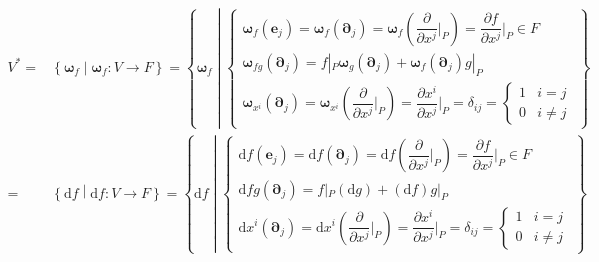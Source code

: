 \documentclass[
]{book}
\theoremstyle{definition}
\theoremstyle{definition}
\theoremstyle{definition}
\theoremstyle{definition}
\theoremstyle{remark}
\begin{document}
\[
\begin{aligned}
V^{*}= & \left\{ \boldsymbol{\omega}_{{\scriptscriptstyle f}}\middle|\boldsymbol{\omega}_{{\scriptscriptstyle f}}:V\rightarrow F\right\} =\left\{ \boldsymbol{\omega}_{{\scriptscriptstyle f}}\middle|\begin{cases}
\boldsymbol{\omega}_{{\scriptscriptstyle f}}\left(\boldsymbol{e}_{{\scriptscriptstyle j}}\right)=\boldsymbol{\omega}_{{\scriptscriptstyle f}}\left(\boldsymbol{\partial}_{{\scriptscriptstyle j}}\right)=\boldsymbol{\omega}_{{\scriptscriptstyle f}}\left(\dfrac{\partial}{\partial x^{{\scriptscriptstyle j}}}|_{{\scriptscriptstyle P}}\right)=\dfrac{\partial f}{\partial x^{{\scriptscriptstyle j}}}|_{{\scriptscriptstyle P}}\in F\\
\boldsymbol{\omega}_{{\scriptscriptstyle fg}}\left(\boldsymbol{\partial}_{{\scriptscriptstyle j}}\right)=f|_{{\scriptscriptstyle P}}\boldsymbol{\omega}_{{\scriptscriptstyle g}}\left(\boldsymbol{\partial}_{{\scriptscriptstyle j}}\right)+\boldsymbol{\omega}_{{\scriptscriptstyle f}}\left(\boldsymbol{\partial}_{{\scriptscriptstyle j}}\right)g|_{{\scriptscriptstyle P}}\\
\boldsymbol{\omega}_{{\scriptscriptstyle x}^{{\scriptscriptstyle i}}}\left(\boldsymbol{\partial}_{{\scriptscriptstyle j}}\right)=\boldsymbol{\omega}_{{\scriptscriptstyle x}^{{\scriptscriptstyle i}}}\left(\dfrac{\partial}{\partial x^{{\scriptscriptstyle j}}}|_{{\scriptscriptstyle P}}\right)=\dfrac{\partial x^{{\scriptscriptstyle i}}}{\partial x^{{\scriptscriptstyle j}}}|_{{\scriptscriptstyle P}}=\delta_{{\scriptscriptstyle ij}}=\begin{cases}
1 & i=j\\
0 & i\ne j
\end{cases}
\end{cases}\right\} \\
= & \left\{ \mathrm{d}f\middle|\mathrm{d}f:V\rightarrow F\right\} =\left\{ \mathrm{d}f\middle|\begin{cases}
\mathrm{d}f\left(\boldsymbol{e}_{{\scriptscriptstyle j}}\right)=\mathrm{d}f\left(\boldsymbol{\partial}_{{\scriptscriptstyle j}}\right)=\mathrm{d}f\left(\dfrac{\partial}{\partial x^{{\scriptscriptstyle j}}}|_{{\scriptscriptstyle P}}\right)=\dfrac{\partial f}{\partial x^{{\scriptscriptstyle j}}}|_{{\scriptscriptstyle P}}\in F\\
\mathrm{d}fg\left(\boldsymbol{\partial}_{{\scriptscriptstyle j}}\right)=f|_{{\scriptscriptstyle P}}\left(\mathrm{d}g\right)+\left(\mathrm{d}f\right)g|_{{\scriptscriptstyle P}}\\
\mathrm{d}x^{{\scriptscriptstyle i}}\left(\boldsymbol{\partial}_{{\scriptscriptstyle j}}\right)=\mathrm{d}x^{{\scriptscriptstyle i}}\left(\dfrac{\partial}{\partial x^{{\scriptscriptstyle j}}}|_{{\scriptscriptstyle P}}\right)=\dfrac{\partial x^{{\scriptscriptstyle i}}}{\partial x^{{\scriptscriptstyle j}}}|_{{\scriptscriptstyle P}}=\delta_{{\scriptscriptstyle ij}}=\begin{cases}
1 & i=j\\
0 & i\ne j
\end{cases}
\end{cases}\right\} 
\end{aligned}
\]
\end{document}

